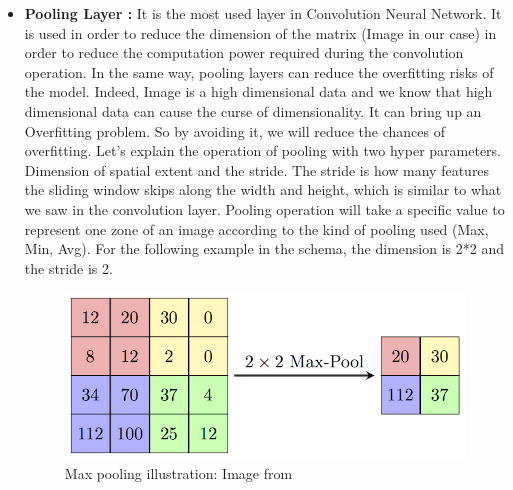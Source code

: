 \documentclass[a4paper]{article}
\begin{document}
\begin{itemize}
    \item{\textbf{Pooling Layer :} It is the most used layer in Convolution Neural Network. It is used in order to reduce the dimension of the matrix (Image in our case) in order to reduce the computation power required during the convolution operation.
        In the same way, pooling layers can reduce the overfitting risks of the model. Indeed, Image is a high dimensional data and we know that high dimensional data can cause the curse of dimensionality. It can bring up an Overfitting problem. So by avoiding it, we will reduce the chances of overfitting.
        Let's explain the operation of pooling with two hyper parameters. Dimension of spatial extent and the stride. 
        The stride is how many features the sliding window skips along the width and height, which is similar to what we saw in the convolution layer. Pooling operation will take a specific value to represent one zone of an image according to the kind of pooling used (Max, Min, Avg).
        For the following example in the schema, the dimension is 2*2 and the stride is 2.
}
  \begin{figure}[H]
      \includegraphics[width=\linewidth]{images/pooling.png}
      \caption{Max pooling illustration: Image from \cite{cs231n}}
      \label{fig:boat1}
    \end{figure}



\end{itemize}
\end{document}
